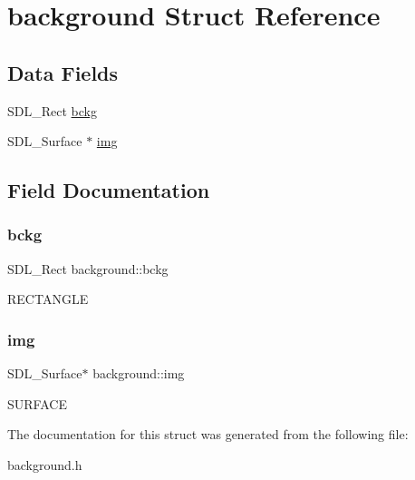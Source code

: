 \hypertarget{structbackground}{}\section{background Struct Reference}
\label{structbackground}
\subsection*{Data Fields}
\begin{DoxyCompactItemize}
\item 
S\+D\+L\+\_\+\+Rect \hyperlink{structbackground_a6cd0518c8d8a98207f008f55de18de1d}{bckg}
\item 
S\+D\+L\+\_\+\+Surface $\ast$ \hyperlink{structbackground_a1c5c3a3ebb56924b9f829602f9641006}{img}
\end{DoxyCompactItemize}


\subsection{Field Documentation}
\mbox{\label{structbackground_a6cd0518c8d8a98207f008f55de18de1d}} 
\subsubsection{\texorpdfstring{bckg}{bckg}}
{\footnotesize\ttfamily S\+D\+L\+\_\+\+Rect background\+::bckg}

R\+E\+C\+T\+A\+N\+G\+LE \mbox{\label{structbackground_a1c5c3a3ebb56924b9f829602f9641006}} 
\subsubsection{\texorpdfstring{img}{img}}
{\footnotesize\ttfamily S\+D\+L\+\_\+\+Surface$\ast$ background\+::img}

S\+U\+R\+F\+A\+CE 

The documentation for this struct was generated from the following file\+:\begin{DoxyCompactItemize}
\item 
background.\+h\end{DoxyCompactItemize}
